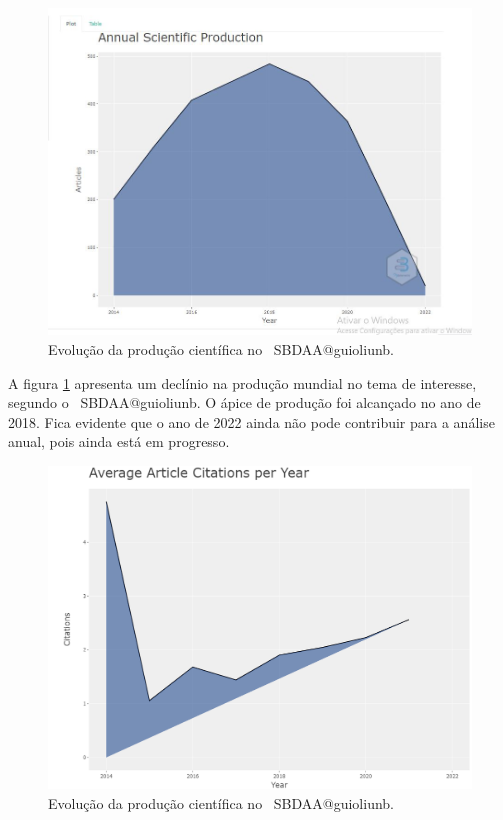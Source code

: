 \begin{figure}
    \centering
    \includegraphics[width=1\textwidth]{experiments/guioliunb/AnaliseBibliometrica/SocialBigDataAnalysis/anual-scientific-production.JPG}
    \caption{Evolução da produção científica no \dataset\   SBDAA@guioliunb.}
    \label{fig:evol:anual:SBDAA@guioliunb}
\end{figure}

A figura \ref{fig:evol:anual:SBDAA@guioliunb} apresenta um declínio na produção mundial no tema de interesse, segundo o \dataset\  SBDAA@guioliunb. O ápice de produção foi alcançado no ano de 2018. Fica evidente que o ano de 2022 ainda não pode contribuir para a análise anual, pois ainda está em progresso.

\begin{figure}
    \centering
    \includegraphics[width=1\textwidth]{experiments/guioliunb/AnaliseBibliometrica/SocialBigDataAnalysis/AVG citation per year.png}
    \caption{Evolução da produção científica no \dataset\   SBDAA@guioliunb.}
    \label{fig:evol:anual:cit:SBDAA@guioliunb}
\end{figure}


